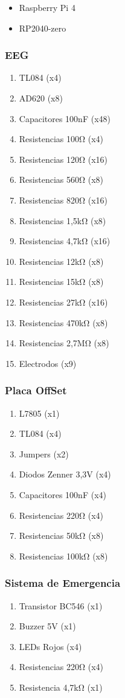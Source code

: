 \documentclass{article}
\begin{document}
\begin{itemize}
    \item Raspberry Pi 4
    \item RP2040-zero
\end{itemize}

\subsubsection{EEG}
\begin{enumerate}
    \item TL084 (x4)
    \item AD620 (x8)
    \item Capacitores 100nF (x48)
    \item Resistencias 100Ω (x4)
    \item Resistencias 120Ω (x16)
    \item Resistencias 560Ω (x8) 
    \item Resistencias 820Ω (x16)
    \item Resistencias 1,5kΩ (x8)
    \item Resistencias 4,7kΩ (x16)
    \item Resistencias 12kΩ (x8)
    \item Resistencias 15kΩ (x8)
    \item Resistencias 27kΩ (x16)
    \item Resistencias 470kΩ (x8)
    \item Resistencias 2,7MΩ (x8)
    \item Electrodos (x9)
\end{enumerate}

\subsubsection{Placa OffSet}
\begin{enumerate}
    \item L7805 (x1)
    \item TL084 (x4)
    \item Jumpers (x2)
    \item Diodos Zenner 3,3V (x4)
    \item Capacitores 100nF (x4)
    \item Resistencias 220Ω (x4)
    \item Resistencias 50kΩ (x8)
    \item Resistencias 100kΩ (x8)
\end{enumerate}

\subsubsection{Sistema de Emergencia}
\begin{enumerate}
    \item Transistor BC546 (x1)
    \item Buzzer 5V (x1)
    \item LEDs Rojos (x4)
    \item Resistencias 220Ω (x4)
    \item Resistencia 4,7kΩ (x1)
\end{enumerate}
\end{document}
